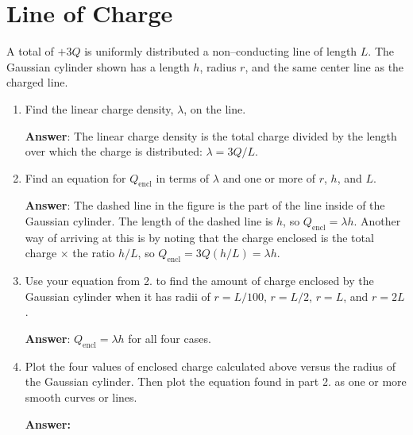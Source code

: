 \documentclass{article}
\begin{document}
\section{Line of Charge}

A total of $+3Q$ is uniformly distributed a non--conducting line of length $L$. The Gaussian cylinder shown has a length $h$, radius $r$, and the same center line as the charged line.



\begin{enumerate}

  \item Find the linear charge density, $\lambda$, on the line.

        \ifsolutions
        {\bf Answer}: The linear charge density is the total charge divided by the length over which the charge is distributed: $\lambda={3Q}/{L}$.
        \fi

        \ifsolutions\else
        \vskip 36pt
        \fi

  \item Find an equation for $Q_{\text{encl}}$ in terms of $\lambda$ and one or more of $r$, $h$, and $L$.

        \ifsolutions
        {\bf Answer}: The dashed line in the figure is the part of the line inside of the Gaussian cylinder. The length of the dashed line is $h$, so $Q_{\text{encl}}=\lambda h$. Another way of arriving at this is by noting that the charge enclosed is the total charge $\times$ the ratio $h/L$, so $Q_{\text{encl}}=3Q(h/L) = \lambda h$.
        \fi

        \ifsolutions\else
        \vskip 36pt
        \fi

  \item Use your equation from 2. to find the amount of charge enclosed by the Gaussian cylinder when it has radii of $r=L/100$, $r=L/2$, $r=L$, and $r=2L$.

        \ifsolutions
        {\bf Answer}: $Q_{\text{encl}}=\lambda h$ for all four cases.
        \fi

        \ifsolutions\else
        \vskip 36pt
        \fi

  \item Plot the four values of enclosed charge calculated above versus the radius of the Gaussian cylinder. Then plot the equation found in part 2. as one or more smooth curves or lines.

        \ifsolutions
        {\bf Answer:}

        
        \fi

        \ifsolutions\else
        \newpage
        \fi

\end{enumerate}
\end{document}
